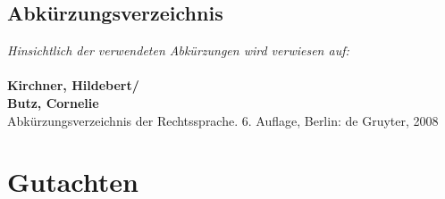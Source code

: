 \documentclass[%
	12pt,%
	paper=a4,
	pagesize,
	oneside,
	draft,%
	ngerman
]{scrreprt}
\begin{document}
{


 



\tableofcontents

 



\chapter*{Abkürzungsverzeichnis}
\vspace{2cm}

\textit{Hinsichtlich der verwendeten Abkürzungen wird verwiesen auf:}
\\
\\
\textbf{Kirchner, Hildebert/ \\
Butz, Cornelie\\}
Abkürzungsverzeichnis der Rechtssprache. 6. Auflage, Berlin: de Gruyter, 2008
\clearpage


\titleformat{\part}[hang]{\huge\raggedleft\bfseries}{\thepart\quad}{0pt}{}
\part*{Gutachten}
}
\restoregeometry %




\setcounter{page}{1}

\end{document}

